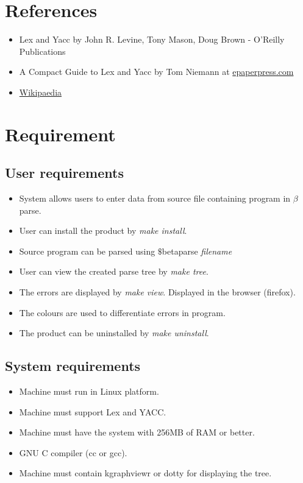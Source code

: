 \documentclass[12pt, oneside, a4paper]{article}
\begin{document}
\section{References}
\begin{itemize}
\item Lex and Yacc by John R. Levine, Tony Mason, Doug Brown - O’Reilly Publications
\item A Compact Guide to Lex and Yacc by Tom Niemann at \href{http://epaperpress.com}{epaperpress.com}
\item \href{http://en.wikipaedia.org/wiki/Syntax analysis}{Wikipaedia}
\end{itemize}

\section{Requirement}
\subsection
{User requirements}
\begin{itemize}
\item System allows users to enter data from source file containing program in $\beta$parse. 
\item User can install the product by \emph{make install}.
\item Source program can be parsed using $\$$betaparse \emph{filename}
\item User can view the created parse tree by \emph{make tree}.
\item The errors are displayed by \emph{make view}. Displayed in the browser (firefox).
\item The colours are used to differentiate errors in program.
\item The product can be uninstalled by \emph{make uninstall}.

\end{itemize}
\subsection
{System requirements}
\begin{itemize}
\item Machine must run in Linux platform.
\item Machine must support Lex and YACC.
\item Machine must have the system with 256MB of RAM or better.
\item GNU C compiler (cc or gcc).
\item Machine must contain kgraphviewr or dotty for displaying the tree.
 \end{itemize}
\end{document}
